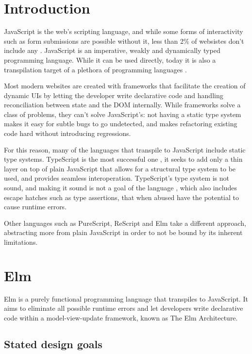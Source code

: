 \chapter*{Introduction}
\setcounter{page}{1}

JavaScript is the web's scripting language, and while some forms of interactivity such as form submissions are possible without it, less than 2\% of websistes don't include any \cite{noauthor_usage_nodate}. JavaScript is an imperative, weakly and dynamically typed programming language. While it can be used directly, today it is also a transpilation target of a plethora of programming languages \cite{noauthor_list_nodate}.

Most modern websites are created with frameworks that facilitate the creation of dynamic UIs by letting the developer write declarative code and handling reconciliation between state and the DOM internally. While frameworks solve a class of problems, they can't solve JavaScript's: not having a static type system makes it easy for subtle bugs to go undetected, and makes refactoring existing code hard without introducing regressions.

For this reason, many of the languages that transpile to JavaScript include static type systems. TypeScript is the most successful one \cite{noauthor_most_nodate}, it seeks to add only a thin layer on top of plain JavaScript that allows for a structural type system to be used, and provides seamless interoperation. TypeScript's type system is not sound, and making it sound is not a goal of the language \cite{noauthor_typescript_nodate}, which also includes escape hatches such as type assertions, that when abused have the potential to cause runtime errors.

Other languages such as PureScript, ReScript and Elm take a different approach, abstracting more from plain JavaScript in order to not be bound by its inherent limitations.

\chapter{Elm}
Elm is a purely functional programming language that transpiles to JavaScript. It aims to eliminate all possible runtime errors and let developers write declarative code within a model-view-update framework, known as The Elm Architecture.

\section{Stated design goals}

